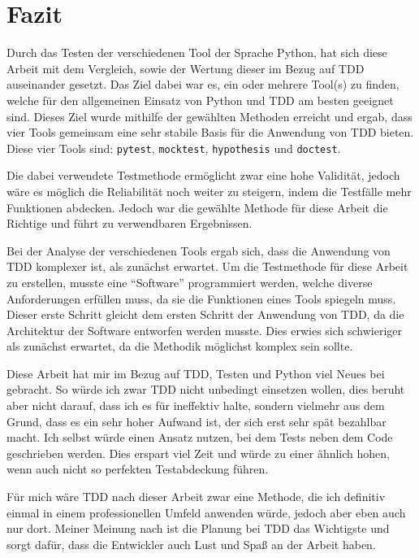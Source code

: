\section{Fazit}\label{fazit}

Durch das Testen der verschiedenen Tool der Sprache Python, hat sich diese
Arbeit mit dem Vergleich, sowie der Wertung dieser im Bezug auf TDD auseinander
gesetzt. Das Ziel dabei war es, ein oder mehrere Tool(s) zu finden, welche für
den allgemeinen Einsatz von Python und TDD am besten geeignet sind. Dieses
Ziel wurde mithilfe der gewählten Methoden erreicht und ergab, dass vier Tools
gemeinsam eine sehr stabile Basis für die Anwendung von TDD bieten. Diese vier
Tools sind: \lstinline{pytest}, \lstinline{mocktest}, \lstinline{hypothesis} und
\lstinline{doctest}.

Die dabei verwendete Testmethode ermöglicht zwar eine hohe Validität, jedoch
wäre es möglich die Reliabilität noch weiter zu steigern, indem die Testfälle
mehr Funktionen abdecken. Jedoch war die gewählte Methode für diese Arbeit die
Richtige und führt zu verwendbaren Ergebnissen.

Bei der Analyse der verschiedenen Tools ergab sich, dass die Anwendung von TDD 
komplexer ist, als zunächst erwartet. Um die Testmethode für diese Arbeit zu 
erstellen, musste eine "`Software"' programmiert werden, welche diverse 
Anforderungen erfüllen muss, da sie die Funktionen eines Tools spiegeln muss. 
Dieser erste Schritt gleicht dem ersten Schritt der Anwendung von 
TDD, da die Architektur der Software entworfen werden musste. Dies erwies sich 
schwieriger als zunächst erwartet, da die Methodik möglichst komplex sein 
sollte.

Diese Arbeit hat mir im Bezug auf TDD, Testen und Python viel Neues bei
gebracht. So würde ich zwar TDD nicht unbedingt einsetzen wollen, dies beruht
aber nicht darauf, dass ich es für ineffektiv halte, sondern vielmehr aus dem
Grund, dass es ein sehr hoher Aufwand ist, der sich erst sehr spät bezahlbar
macht. Ich selbst würde einen Ansatz nutzen, bei dem Tests neben dem 
Code geschrieben werden. Dies erspart viel Zeit und würde zu einer ähnlich 
hohen, wenn auch nicht so perfekten Testabdeckung führen.

Für mich wäre TDD nach dieser Arbeit zwar eine Methode, die ich definitiv 
einmal in einem professionellen Umfeld anwenden würde, jedoch aber eben auch 
nur dort. Meiner Meinung nach ist die Planung bei TDD das Wichtigste und sorgt 
dafür, dass die Entwickler auch Lust und Spaß an der Arbeit haben.